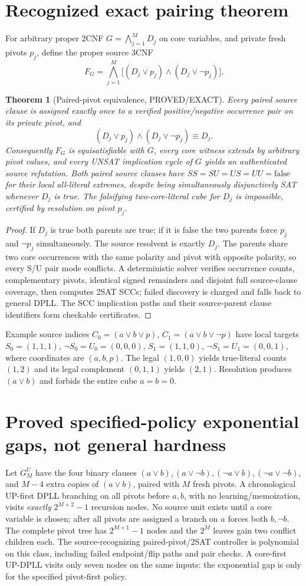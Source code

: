 \documentclass[11pt]{article}
\newtheorem{theorem}{Theorem}
\begin{document}
\section{Recognized exact pairing theorem}
For arbitrary proper 2CNF $G=\bigwedge_{j=1}^M D_j$ on core variables,
and private fresh pivots $p_j$, define the proper source 3CNF
\[
F_G=\bigwedge_{j=1}^M
   \big[(D_j\vee p_j)\wedge(D_j\vee\neg p_j)\big].
\]
\begin{theorem}[Paired-pivot equivalence, PROVED/EXACT]
Every paired source clause is assigned exactly once to a verified
positive/negative occurrence pair on its private pivot, and
\[
 (D_j\vee p_j)\wedge(D_j\vee\neg p_j)\equiv D_j.
\]
Consequently $F_G$ is equisatisfiable with $G$, every core witness
extends by arbitrary pivot values, and every UNSAT implication cycle
of $G$ yields an authenticated source refutation. Both paired source
clauses have $SS=SU=US=UU=\text{false}$ for their local all-literal
extremes, despite being simultaneously disjunctively SAT whenever
$D_j$ is true. The falsifying two-core-literal cube for $D_j$ is
impossible, certified by resolution on pivot $p_j$.
\end{theorem}
\begin{proof}
If $D_j$ is true both parents are true; if it is false the two
parents force $p_j$ and $\neg p_j$ simultaneously. The source
resolvent is exactly $D_j$. The parents share two core occurrences
with the same polarity and pivot with opposite polarity, so every
S/U pair mode conflicts. A deterministic solver verifies occurrence
counts, complementary pivots, identical signed remainders and disjoint
full source-clause coverage, then computes 2SAT SCCs; failed discovery
is charged and falls back to general DPLL. The SCC implication paths
and their source-parent clause identifiers form checkable certificates.
\end{proof}
Example source indices $C_0=(a\vee b\vee p)$,
$C_1=(a\vee b\vee\neg p)$ have local targets
$S_0=(1,1,1)$, $\neg S_0=U_0=(0,0,0)$,
$S_1=(1,1,0)$, $\neg S_1=U_1=(0,0,1)$,
where coordinates are $(a,b,p)$. The legal $(1,0,0)$ yields true-literal
counts $(1,2)$ and its legal complement $(0,1,1)$ yields $(2,1)$.
Resolution produces $(a\vee b)$ and forbids the entire cube $a=b=0$.
\section{Proved specified-policy exponential gaps, not general hardness}
Let $G_M^{U}$ have the four binary clauses
$(a\vee b),(a\vee\neg b),(\neg a\vee b),(\neg a\vee\neg b)$,
and $M-4$ extra copies of $(a\vee b)$, paired with $M$ fresh pivots.
A chronological UP-first DPLL branching on all pivots before $a,b$,
with no learning/memoization, visits \emph{exactly}
$2^{M+2}-1$ recursion nodes. No source unit exists until a core
variable is chosen; after all pivots are assigned a branch on $a$
forces both $b,\neg b$. The complete pivot tree has $2^{M+1}-1$
nodes and the $2^M$ leaves gain two conflict children each.
The source-recognizing paired-pivot/2SAT controller is polynomial on
this class, including failed endpoint/flip paths and pair checks.
A core-first UP-DPLL visits only seven nodes on the same inputs:
the exponential gap is only for the specified pivot-first policy.
\end{document}
